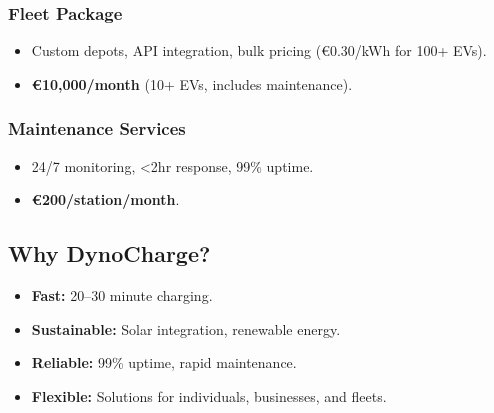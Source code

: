 \subsubsection*{Fleet Package}
\begin{itemize}
    \item Custom depots, API integration, bulk pricing (€0.30/kWh for 100+ EVs).
    \item \textbf{€10,000/month} (10+ EVs, includes maintenance).
\end{itemize}

\subsubsection*{Maintenance Services}
\begin{itemize}
    \item 24/7 monitoring, <2hr response, 99\% uptime.
    \item \textbf{€200/station/month}.
\end{itemize}

\subsection*{Why DynoCharge?}
\begin{itemize}
    \item \textbf{Fast:} 20–30 minute charging.
    \item \textbf{Sustainable:} Solar integration, renewable energy.
    \item \textbf{Reliable:} 99\% uptime, rapid maintenance.
    \item \textbf{Flexible:} Solutions for individuals, businesses, and fleets.
\end{itemize}
